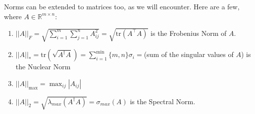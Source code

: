\documentclass{article}
\newcommand{\1}{\mathbf{1}}
\newcommand{\tr}{\mathrm{tr}}
\newcommand{\0}{\mathbf{0}}
\newcommand{\RR}{\mathbb{R}}
\newcommand{\T}{\top}
\begin{document}
Norms can be extended to matrices too, as we will encounter. Here are
a few, where $A\in\RR^{m\times n}$:
\begin{enumerate}
    \item $||A||_F = \sqrt{\sum_{i=1}^m\sum_{j=1}^n A_{ij}^2} = \sqrt{\tr(A^\T A)}$ is the Frobenius Norm of $A$.
    \item $||A||_* = \tr(\sqrt{A^\dagger A}) = \sum_{i=1}^\min\{m,n\}\sigma_i = $(sum of the singular values of $A$) is the Nuclear Norm
    \item $||A||_{\mathrm{max}} = \max_{ij}|A_{ij}|$
    \item $||A||_2 = \sqrt{\lambda_{max}(A^\dagger A)} = \sigma_{max}(A)$ is the Spectral Norm.
\end{enumerate}
\end{document}
